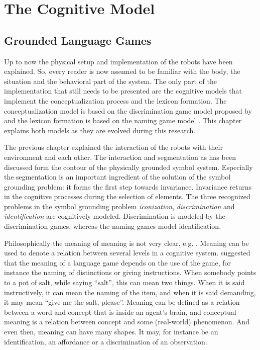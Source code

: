 \chapter{The Cognitive Model}\label{ch:cm}

\section{Grounded Language Games}

Up to now the physical setup and implementation of the robots have been explained. So, every reader is now assumed to be familiar with the body, the situation and the behavioral part of the system. The only part of the implementation that still needs to be presented are the cognitive models that implement the conceptualization process and the lexicon formation. The conceptualization model is based on the discrimination game model proposed by \cite{steels:1996b} and the lexicon formation is based on the naming game model \cite{steels:1996a}. This chapter explains both models as they are evolved during this research.

\p
The previous chapter explained the interaction of the robots with their environment and each other. The interaction and segmentation as has been discussed form the contour of the physically grounded symbol system. Especially the segmentation is an important ingredient of the solution of the symbol grounding problem: it forms the first step towards invariance. Invariance returns in the cognitive processes during the selection of elements. The three recognized problems in the symbol grounding problem {\em iconization}, {\em discrimination} and {\em identification} \cite{harnad:1990} are cognitively modeled. Discrimination is modeled by the discrimination games, whereas the naming games model identification.

Philosophically the meaning of meaning is not very clear, e.g. \cite{putnam:1975}. Meaning can be used to denote a relation between several levels in a cognitive system.  suggested that the meaning of a language game depends on the use of the game, for instance the naming of distinctions or giving instructions. When somebody points to a pot of salt, while saying ``salt'', this can mean two things. When it is said instructively, it can mean the naming of the item, and when it is said demanding, it may mean ``give me the salt, please''. Meaning can  be defined as a relation between a word and concept that is inside an agent's brain, and conceptual meaning is a relation between concept and some (real-world) phenomenon. And even then, meaning can have many shapes. It may, for instance be an identification, an affordance or a discrimination of an observation. 

